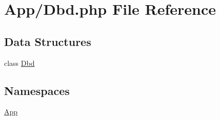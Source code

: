 \hypertarget{_dbd_8php}{}\section{App/\+Dbd.php File Reference}
\label{_dbd_8php}
\subsection*{Data Structures}
\begin{DoxyCompactItemize}
\item 
class \hyperlink{class_app_1_1_dbd}{Dbd}
\end{DoxyCompactItemize}
\subsection*{Namespaces}
\begin{DoxyCompactItemize}
\item 
 \hyperlink{namespace_app}{App}
\end{DoxyCompactItemize}

